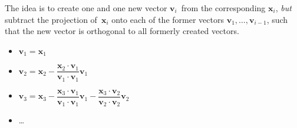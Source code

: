 \documentclass[12p,a4paper]{report}
\renewcommand{\b}{\boldsymbol}
\begin{document}
The idea is to create one and one new vector $\b v_i$ from the corresponding $\b x_i$, \textit{but} subtract the projection of $\b x_i$ onto each of the former vectors $\b v_1, \dots, \b v_{i-1}$, such that the new vector is orthogonal to all formerly created vectors.
\begin{itemize}
    \item $\b v_1 = \b x_1$
    \item $\b v_2 = \b x_2 - \dfrac{\b x_2 \cdot \b v_1}{\b v_1 \cdot \b v_1}\b v_1$
    \item $\b v_3 = \b x_3 - \dfrac{\b x_3 \cdot \b v_1}{\b v_1 \cdot \b v_1}\b v_1
     - \dfrac{\b x_3 \cdot \b v_2}{\b v_2 \cdot \b v_2}\b v_2$
    \item \dots
\end{itemize}
\end{document}
